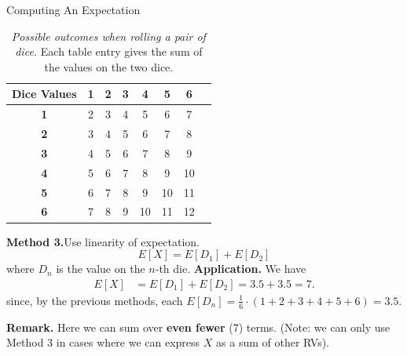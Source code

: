 \documentclass[10pt]{beamer}
\begin{document}
\begin{frame}{Computing An Expectation}
\footnotesize  
\begin{table}
\caption{\textit{Possible outcomes when rolling a pair of dice.} Each table entry gives the sum of the values on the two dice.}	
\begin{tabular}{|c|c|c|c|c|c|c|c|}
\hline
\textbf{Dice Values} & \textbf{1} & \textbf{2} & \textbf{3} & \textbf{4} & \textbf{5} & \textbf{6} \\
\hline
\textbf{1} & \cellcolor{red!20} 2  & \cellcolor{red!40} 3  & \cellcolor{red!60} 4  & \cellcolor{red!80} 5  & \cellcolor{red!90} 6  & \cellcolor{red!100} 7 \\
\hline
\textbf{2} & \cellcolor{red!40} 3  & \cellcolor{red!60} 4  & \cellcolor{red!80} 5  & \cellcolor{red!90} 6  & \cellcolor{red!100} 7  & \cellcolor{orange!80} 8 \\
\hline
\textbf{3} & \cellcolor{red!60} 4  & \cellcolor{red!80} 5  & \cellcolor{red!90} 6  & \cellcolor{red!100} 7  & \cellcolor{orange!80} 8  & \cellcolor{orange!60} 9 \\
\hline
\textbf{4} & \cellcolor{red!80} 5  & \cellcolor{red!90} 6  & \cellcolor{red!100} 7  & \cellcolor{orange!80} 8  & \cellcolor{orange!60} 9  & \cellcolor{orange!40} 10 \\
\hline
\textbf{5} & \cellcolor{red!90} 6  & \cellcolor{red!100} 7  & \cellcolor{orange!80} 8  & \cellcolor{orange!60} 9  & \cellcolor{orange!40} 10 & \cellcolor{orange!20} 11 \\
\hline
\textbf{6} & \cellcolor{red!100} 7 & \cellcolor{orange!80} 8 & \cellcolor{orange!60} 9 & \cellcolor{orange!40} 10 & \cellcolor{orange!20} 11 & \cellcolor{yellow!20} 12 \\
\hline
\end{tabular}
\end{table}

\vfill 
\colorbox{blue!30}{\textbf{Method 3.}}\pause  Use linearity of expectation.
\[ E[X] = E[D_1] + E[D_2] \]
where $D_n$ is the value on the $n$-th die.
\vfill 
\pause 
\colorbox{blue!30}{\textbf{Application.}} We have 
\begin{align*}
 E[X] &= E[D_1] + E[D_2] = 3.5 + 3.5 = 7.
\end{align*}
%
since, by the previous methods, each $E[D_n] = \frac{1}{6} \cdot  (1+2+3+4+5+6) = 3.5$.

\vfill 
\pause 
\colorbox{blue!30}{\textbf{Remark.}} \; Here we can sum over \textbf{even fewer} (7) terms.   (Note: we can only use Method 3 in cases where we can express $X$ as a sum of other RVs).
\end{frame}
\end{document}
